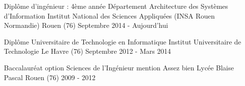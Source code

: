 

\begin{cventries}

  \cventryFour
    {Diplôme d'ingénieur : 4ème année Département Architecture des Systèmes d'Information} %
    {Institut National des Sciences Appliquées (INSA Rouen Normandie)} %
    {Rouen (76)} %
    {Septembre 2014 - Aujourd'hui} %
    
    
  \cventryFour
	{Diplôme Universitaire de Technologie en Informatique} %
	{Institut Universitaire de Technologie} %
	{Le Havre (76)} %
	{Septembre 2012 - Mars 2014} %
	{}
	
  \cventryFour
	{Baccalauréat option Sciences de l'Ingénieur mention Assez bien} %
	{Lycée Blaise Pascal} %
	{Rouen (76)} %
	{2009 - 2012} %
	{}
	
	
\end{cventries}
